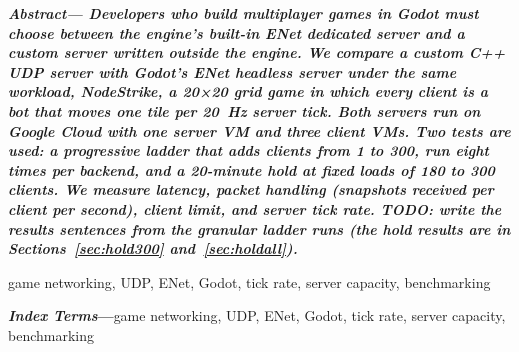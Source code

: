 \IfFileExists{IEEEtran.cls}{\ieeetrue\documentclass[conference]{IEEEtran}}{\ieeefalse\documentclass[twocolumn,10pt]{article}}
\renewenvironment{abstract}{\par\noindent\small\bfseries\itshape Abstract---\upshape}{\par\vspace{6pt}}
\begin{document}
\begin{abstract}
Developers who build multiplayer games in Godot must choose between the engine's built-in
ENet dedicated server and a custom server written outside the engine. We compare a custom C++ UDP
server with Godot's ENet headless server under the same workload, NodeStrike, a 20×20 grid game
in which every client is a bot that moves one tile per 20~Hz server tick. Both servers run on
Google Cloud with one server VM and three client VMs. Two tests are used: a progressive
ladder that adds clients from 1 to 300, run eight times per backend, and a 20-minute hold at fixed loads of 180 to 300
clients. We measure latency, packet handling (snapshots received per client per second), client limit, and server
tick rate. TODO: write the results sentences from the granular ladder runs (the hold results are in Sections~\ref{sec:hold300} and~\ref{sec:holdall}).
\end{abstract}
\ifieee\begin{IEEEkeywords}
game networking, UDP, ENet, Godot, tick rate, server capacity, benchmarking
\end{IEEEkeywords}\else\par\noindent\small\textbf{\textit{Index Terms}---}game networking, UDP, ENet, Godot, tick rate, server capacity, benchmarking\par\fi
\end{document}
